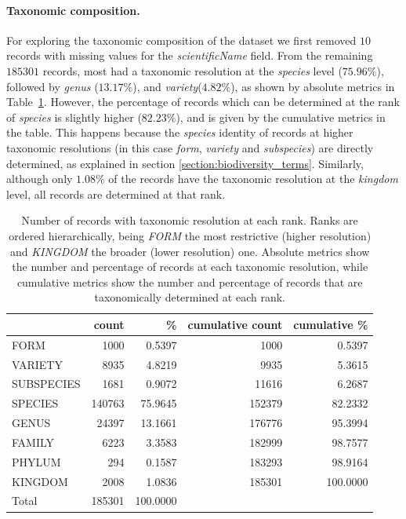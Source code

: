 \paragraph*{Taxonomic composition.}
% 
For exploring the taxonomic composition of the dataset we first removed $10$ records with missing values for the \textit{scientificName} field.
From the remaining $185301$ records, most had a taxonomic resolution at the \textit{species} level ($75.96\%$), followed by \textit{genus} ($13.17\%$), and \textit{variety}($4.82\%$), as shown by absolute metrics in Table~\ref{table:dset_taxonomicres_counts}. 
However, the percentage of records which can be determined at the rank of \textit{species} is slightly higher ($82.23\%$), and is given by the cumulative metrics in the table. 
This happens because the \textit{species} identity of records at higher taxonomic resolutions (in this case \textit{form}, \textit{variety} and \textit{subspecies}) are directly determined, as explained in section \ref{section:biodiversity_terms}.
Similarly, although only $1.08\%$ of the records have the taxonomic resolution at the \textit{kingdom} level, all records are determined at that rank.

\begin{table}
  \caption[Number of records with taxonomic resolution at each rank.]{Number of records with taxonomic resolution at each rank. Ranks are ordered hierarchically, being \textit{FORM} the most restrictive (higher resolution) and \textit{KINGDOM} the broader (lower resolution) one. Absolute metrics show the number and percentage of records at each taxonomic resolution, while cumulative metrics show the number and percentage of records that are taxonomically determined at each rank.}
  \begin{center}
  \begin{tabular}{l r r r r}
       & count & \% & cumulative count & cumulative \% \\
      \hline
      FORM & 1000 & 0.5397 & 1000 & 0.5397\\
      VARIETY & 8935 & 4.8219 & 9935 & 5.3615\\
      SUBSPECIES & 1681 & 0.9072 & 11616 & 6.2687\\
      SPECIES & 140763 & 75.9645 & 152379 & 82.2332\\
      GENUS & 24397 & 13.1661 & 176776 & 95.3994\\
      FAMILY & 6223 & 3.3583 & 182999 & 98.7577\\
      PHYLUM & 294 & 0.1587 & 183293 & 98.9164\\
      KINGDOM & 2008 & 1.0836 & 185301 & 100.0000\\
      \hline
      Total & 185301 & 100.0000 & &
  \end{tabular}
  \end{center}
  \label{table:dset_taxonomicres_counts}
\end{table}



